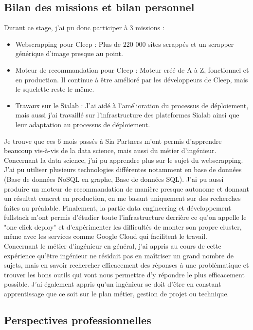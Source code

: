 \documentclass{article} %
\begin{document}
{\subsection{Bilan des missions et bilan personnel}
Durant ce stage, j'ai pu donc participer à 3 missions :
\begin{itemize}
 \item Webscrapping pour Cleep : Plus de 220 000 sites scrappés et un scrapper générique d'image presque au point.
 \item Moteur de recommandation pour Cleep : Moteur créé de A à Z, fonctionnel et en production. Il continue à être amélioré par les développeurs de Cleep, mais le squelette reste le même. 
 \item Travaux sur le Sialab : J'ai aidé à l'amélioration du processus de déploiement, mais aussi j'ai travaillé sur l'infrastructure des plateformes Sialab ainsi que leur adaptation au processus de déploiement.
\end{itemize}

Je trouve que ces 6 mois passés à Sia Partners m'ont permis d'apprendre beaucoup vis-à-vis de la data science, mais aussi du métier d'ingénieur. Concernant la data science, j'ai pu apprendre plus sur le sujet du webscrapping. J'ai pu utiliser plusieurs technologies différentes notamment en base de données (Base de données NoSQL en graphe, Base de données SQL). J'ai pu aussi produire un moteur de recommandation de manière presque autonome et donnant un résultat concret en production, en me basant uniquement sur des recherches faites au préalable. Finalement, la partie data engineering et développement  fullstack m'ont permis d'étudier toute l'infrastructure derrière ce qu'on appelle le "one click deploy" et d'expérimenter les difficultés de monter son propre cluster, même avec les services comme Google Cloud qui facilitent le travail.\\

Concernant le métier d’ingénieur en général, j’ai appris au cours de cette
expérience qu’être ingénieur ne résidait pas en maîtriser un grand nombre de sujets,
mais en savoir rechercher efficacement des réponses à une problématique et trouver
les bons outils qui vont nous permettre d’y répondre le plus efficacement possible. J’ai
également appris qu’un ingénieur se doit d’être en constant apprentissage que ce
soit sur le plan métier, gestion de projet ou technique.

\subsection{Perspectives professionnelles}

}
\end{document}
